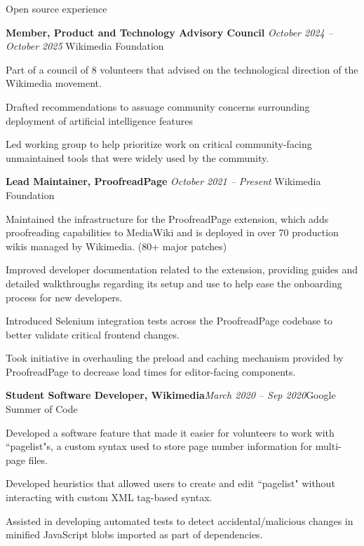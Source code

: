 \documentclass{resume} %
\begin{document}
\begin{rSection}{Open source experience}
\begin{rSubsection}{ \bf Member, Product and Technology Advisory Council}{ \em October 2024 -- October 2025 }{Wikimedia Foundation}{}
\item Part of a council of 8 volunteers that advised on the technological direction of the Wikimedia movement.
\item Drafted recommendations to assuage community concerns surrounding deployment of artificial intelligence features
\item Led working group to help prioritize work on critical community-facing unmaintained tools that were widely used by the community.
\end{rSubsection}
\begin{rSubsection}{ \bf Lead Maintainer, ProofreadPage}{ \em October 2021 -- Present }{Wikimedia Foundation}{}
\item Maintained the infrastructure for the ProofreadPage extension, which adds proofreading capabilities to MediaWiki and is deployed in over 70 production wikis managed by Wikimedia. (80+ major patches)
\item Improved developer documentation related to the extension, providing guides and detailed walkthroughs regarding its setup and use to help ease the onboarding process for new developers.
\item Introduced Selenium integration tests across the ProofreadPage codebase to better validate critical frontend changes.
\item Took initiative in overhauling the preload and caching mechanism provided by ProofreadPage to decrease load times for editor-facing components.
\end{rSubsection}
%
\begin{rSubsection}{ \bf Student Software Developer, Wikimedia}{\em March 2020 -- Sep 2020}{Google Summer of Code}{}
\item Developed a software feature that made it easier for volunteers to work with ``pagelist"s, a custom syntax used to store page number information for multi-page files.
\item Developed heuristics that allowed users to create and edit ``pagelist" without interacting with custom XML tag-based syntax.
\item Assisted in developing automated tests to detect accidental/malicious changes in minified JavaScript blobs imported as part of dependencies.
\end{rSubsection}
\end{rSection}
\end{document}
